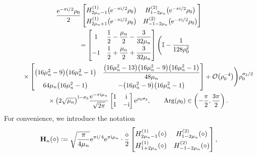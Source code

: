 \documentclass[pdftex]{sigma}
\numberwithin{equation}{section}
\newcommand{\ee}{\mathrm{e}}
\newcommand{\ii}{\mathrm{i}}
\renewcommand{\arg}{\operatorname{Arg}}
\begin{document}
\begin{gather}
\dfrac{\ee^{-\pi \ii /2}\rho_0}{2} \begin{bmatrix} H^{(1)}_{2\mu_n-1}\big(\ee^{-\pi \ii/2} \rho_0\big) & H^{(2)}_{1 -2\mu_n}\big(\ee^{-\pi \ii/2} \rho_0\big)\vspace{1mm}\\ H^{(1)}_{2\mu_n + 1}\big(\ee^{-\pi \ii/2} \rho_0\big) & H^{(2)}_{-1-2\mu_n}\big(\ee^{-\pi \ii/2} \rho_0\big)\end{bmatrix} \nonumber\\
\qquad= \begin{bmatrix} 1 & \dfrac{1}{2} - \dfrac{\mu_n}{2} - \dfrac{3}{32\mu_n} \vspace{1mm}\\ -1 & \dfrac{1}{2} + \dfrac{\mu_n}{2} + \dfrac{3}{32\mu_n} \end{bmatrix} \Biggl( \mathbb{I} - \dfrac{1}{128 \rho_0^2}  \nonumber\\
\phantom{\qquad=}{}  \times\begin{bmatrix} \big(16\mu_n^2 - 9\big)\big(16\mu_n^2 - 1\big) & \dfrac{\big(16 \mu_n^2 - 13\big)\big(16\mu_n^2 - 9\big)\big(16\mu_n^2 - 1\big)}{48\mu_n} \vspace{1mm}\\ 64\mu_n\big(16\mu_n^2 - 1\big) & - \big(16\mu_n^2 - 9\big)\big(16\mu_n^2 - 1\big)\end{bmatrix} + \mathcal{O}\big(\rho_0^{-4}\big) \Biggr) \rho_0^{\sigma_3/2}\nonumber\\
\phantom{\qquad=}{} \times \big(2\sqrt{\mu_n}\big)^{\mathbb{I}-\sigma_3}{\dfrac{\ee^{-\pi \ii \mu_n}}{\sqrt{2\pi}}} {}{} \begin{bmatrix} 1 & \ii\\ 1 &-\ii \end{bmatrix} \ee^{ \rho_0 \sigma_3}, \qquad \arg(\rho_0) \in \left( -\dfrac{\pi}{2}, \dfrac{3\pi}{2} \right).
\label{eq:H-expand-zero}
\end{gather}
For convenience, we introduce the notation
\begin{equation}
 \mathbf{H}_n(\diamond) := \sqrt{\dfrac{\pi}{4\mu_n}} \ee^{\pi \ii/4 }\ee^{\pi \ii \mu_n} \cdot \dfrac{\diamond}{2} \begin{bmatrix} H^{(1)}_{2\mu_n - 1}(\diamond) & H^{(2)}_{1 - 2\mu_n }(\diamond) \vspace{1mm}\\ H^{(1)}_{1 + 2\mu_n}(\diamond) & H^{(2)}_{-1-2\mu_n}(\diamond) \end{bmatrix},
 \label{eq:Bn-def}
\end{equation}
\end{document}
